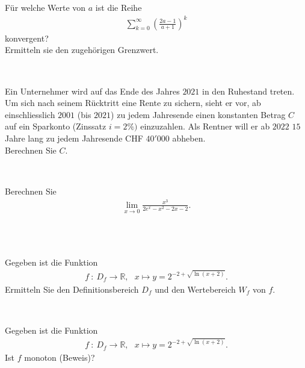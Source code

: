 \subsection*{}
Für welche Werte von $a$ ist die Reihe 
\begin{align*}
\sum \limits_{k=0}^\infty \left( \frac{2 a -1}{a+1} \right)^k
\end{align*}
konvergent?\\
Ermitteln sie den zugehörigen Grenzwert.
\\
\\
\subsection*{}
Ein Unternehmer wird auf das Ende des Jahres $2021$ in den Ruhestand treten.
Um sich nach seinem Rücktritt eine Rente zu sichern, sieht er vor,
ab einschliesslich $2001$ (bis $2021$) zu jedem Jahresende einen
konstanten Betrag $C$ auf ein Sparkonto (Zinssatz $i = 2\%)$ einzuzahlen.
Als Rentner will er ab $2022$ $15$ Jahre lang zu jedem Jahresende
CHF $40'000$ abheben.\\
Berechnen Sie $C$.
\\
\\
\subsection*{}
Berechnen Sie
\begin{align*}
\lim \limits_{x \rightarrow 0}
\frac{x^3}{2e^x-x^2-2x-2}.
\end{align*}
\ \\
\\
\subsection*{}
Gegeben ist die Funktion
\begin{align*}
f \ : \ D_f \to \mathbb{R}, \ \ \
x \mapsto y = 2^{-2 + \sqrt{\ln(x+2)}}. 
\end{align*}
Ermitteln Sie den Definitionsbereich $D_f$ und den Wertebereich $W_f$ von $f$.
\ \\
\\
\subsection*{}
Gegeben ist die Funktion
\begin{align*}
f \ : \ D_f \to \mathbb{R}, \ \ \
x \mapsto y = 2^{-2 + \sqrt{\ln(x+2)}}. 
\end{align*}
Ist $f$ monoton (Beweis)?
\ \\
\\
